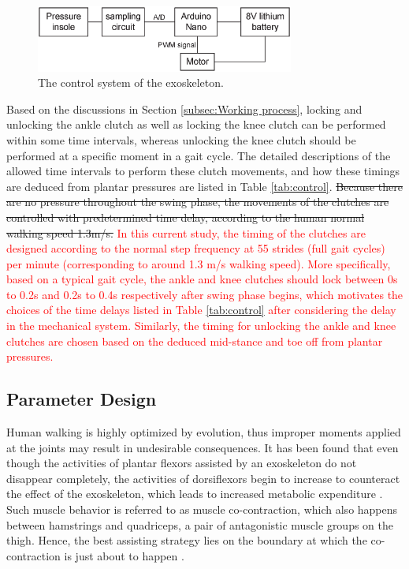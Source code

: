 \documentclass[twocolumn,cleanfoot,10pt]{asme2ej}
\begin{document}
\begin{figure}[t]
	\centering
	\includegraphics[width=8.5cm]{control.eps}
	\caption{The control system of the exoskeleton.}
	\label{fig:control}   
\end{figure}

Based on the discussions in Section \ref{subsec:Working process}, locking and unlocking the ankle clutch as well as locking the knee clutch can be performed within some time intervals, whereas unlocking the knee clutch should be performed at a specific moment in a gait cycle.
The detailed descriptions of the allowed time intervals to perform these clutch movements, and how these timings are deduced from plantar pressures are listed in Table \ref{tab:control}.
\sout{Because there are no pressure throughout the swing phase, the movements of the clutches are controlled with predetermined time delay, according to the human normal walking speed 1.3m/s.}
\textcolor{red}{In this current study, the timing of the clutches are designed according to the normal step frequency at 55 strides (full gait cycles) per minute (corresponding to around 1.3 m/s walking speed).
More specifically, based on a typical gait cycle, the ankle and knee clutches should lock between 0s to 0.2s and 0.2s to 0.4s respectively after swing phase begins, which motivates the choices of the time delays listed in Table \ref{tab:control} after considering the delay in the mechanical system.
Similarly, the timing for unlocking the ankle and knee clutches are chosen based on the deduced mid-stance and toe off from plantar pressures.}


\subsection{Parameter Design}

\label{sec:parameter design}

Human walking is highly optimized by evolution, thus improper moments applied at the joints may result in undesirable consequences.
It has been found that even though the activities of plantar flexors assisted by an exoskeleton do not disappear completely, the activities of dorsiflexors begin to increase to counteract the effect of the exoskeleton, which leads to increased metabolic expenditure \cite{RN4}.
Such muscle behavior is referred to as muscle co-contraction, which also happens between hamstrings and quadriceps, a pair of antagonistic muscle groups on the thigh.
Hence, the best assisting strategy lies on the boundary at which the co-contraction is just about to happen \cite{RN22}. 
\end{document}
